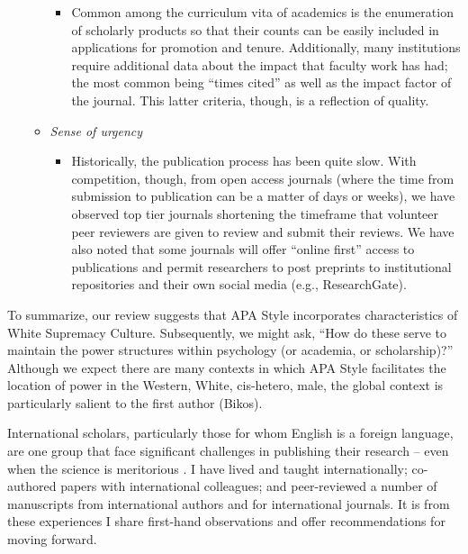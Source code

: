 \documentclass[
  11pt,
]{book}
\providecommand{\tightlist}{%
  \setlength{\itemsep}{0pt}\setlength{\parskip}{0pt}}
\begin{document}
\begin{itemize}
\begin{itemize}
    \begin{itemize}
    \tightlist
    \item
      Common among the curriculum vita of academics is the enumeration of scholarly products so that their counts can be easily included in applications for promotion and tenure. Additionally, many institutions require additional data about the impact that faculty work has had; the most common being ``times cited'' as well as the impact factor of the journal. This latter criteria, though, is a reflection of quality.
    \end{itemize}
  \item
    \emph{Sense of urgency}

    \begin{itemize}
    \tightlist
    \item
      Historically, the publication process has been quite slow. With competition, though, from open access journals (where the time from submission to publication can be a matter of days or weeks), we have observed top tier journals shortening the timeframe that volunteer peer reviewers are given to review and submit their reviews. We have also noted that some journals will offer ``online first'' access to publications and permit researchers to post preprints to institutional repositories and their own social media (e.g., ResearchGate).
    \end{itemize}
  \end{itemize}
\end{itemize}

To summarize, our review suggests that APA Style incorporates characteristics of White Supremacy Culture. Subsequently, we might ask, ``How do these serve to maintain the power structures within psychology (or academia, or scholarship)?'' Although we expect there are many contexts in which APA Style facilitates the location of power in the Western, White, cis-hetero, male, the global context is particularly salient to the first author (Bikos).

International scholars, particularly those for whom English is a foreign language, are one group that face significant challenges in publishing their research -- even when the science is meritorious \citep{gibbons_inaugural_2012}. I have lived and taught internationally; co-authored papers with international colleagues; and peer-reviewed a number of manuscripts from international authors and for international journals. It is from these experiences I share first-hand observations and offer recommendations for moving forward.
\end{document}
